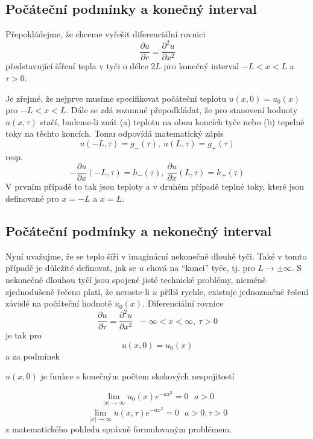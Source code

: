 \documentclass[a4paper]{book}
\begin{document}
\subsection{Počáteční podmínky a konečný interval}

Přepokládejme, že chceme vyřešit diferenciální rovnici
\begin{equation*}
\frac{\partial u}{\partial r} = \frac{\partial^2 u}{\partial x^2}
\end{equation*}
představující šíření tepla v tyči o délce $2L$ pro konečný interval $-L < x < L$ a $\tau > 0$.

Je zřejmé, že nejprve musíme specifikovat počáteční teplotu $u(x, 0) = u_0(x)$ pro $-L < x < L$. Dále se zdá rozumné přepodkládat, že pro stanovení hodnoty $u(x, \tau)$ stačí, budeme-li znát (a) teplotu na obou koncích tyče nebo (b) tepelné toky na těchto koncích. Tomu odpovídá matematický zápis
\begin{equation*}
u(-L, \tau) = g_-(\tau),~u(L, \tau)=g_+(\tau)
\end{equation*}
resp.
\begin{equation*}
-\frac{\partial u}{\partial x}(-L, \tau) = h_-(\tau),~\frac{\partial u}{\partial x}(L, \tau) = h_+(\tau)
\end{equation*}
V prvním případě to tak jsou teploty a v druhém případě teplné toky, které jsou definované pro $x = -L$ a $x = L$.

\subsection{Počáteční podmínky a nekonečný interval}

Nyní uvažujme, že se teplo šíří v imaginární nekonečně dlouhé tyči. Také v tomto případě je důležité definovat, jak se $u$ chová na ``konci'' tyče, tj. pro $L \rightarrow \pm \infty$. S nekonečně dlouhou tyčí jsou spojené jisté technické problémy, nicméně zjednodušeně řečeno platí, že neroste-li $u$ příliš rychle, existuje jednoznačné řešení závislé na počáteční hodnotě $u_0(x)$. Diferenciální rovnice
\begin{equation}
\frac{\partial u}{\partial \tau} = \frac{\partial^2 u}{\partial x^2} ~~~ -\infty < x < \infty, ~ \tau > 0
\end{equation}
 je tak pro
\begin{equation*}
u(x,0) = u_0(x)
\end{equation*}
a za podmínek
\begin{center}
$u(x, 0)$ je funkce s konečným počtem skokových nespojitostí
\end{center}
\begin{equation}
\underset{|x| \rightarrow \infty} \lim u_0(x)e^{-ax^2} = 0 ~~~ a > 0
\end{equation}
\begin{equation}
\underset{|x| \rightarrow \infty} \lim u(x, \tau)e^{-ax^2} = 0 ~~~ a > 0, \tau > 0
\end{equation}
z matematického pohledu správně formulovaným problémem.
\end{document}
